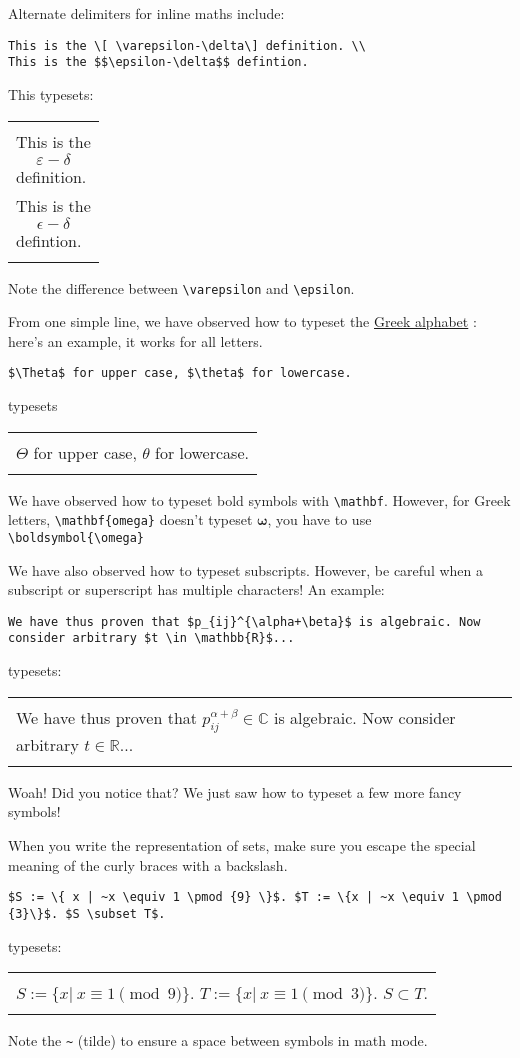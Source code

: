 \documentclass[12pt, letterpaper]{article}
\theoremstyle{remark}
\renewenvironment{boxed}
    {\begin{center}
    \begin{tabular}{|p{0.9\textwidth}|}
    \hline\\
    }
    { 
    \\\\\hline
    \end{tabular} 
    \end{center}
    }
\begin{document}
Alternate delimiters for inline maths include:
\begin{lstlisting}
This is the \[ \varepsilon-\delta\] definition. \\
This is the $$\epsilon-\delta$$ defintion.
\end{lstlisting}
This typesets:
\begin{boxed}
This is the \[\varepsilon-\delta\] definition. \\
This is the $$\epsilon-\delta$$ defintion.
\end{boxed}

Note the difference between \verb!\varepsilon! and \verb!\epsilon!. 

From one simple line, we have observed how to typeset the \href{https://web.mit.edu/jmorzins/www/greek-alphabet.html}{Greek alphabet} \cite{greek}: here's an example, it works for all letters.
\begin{lstlisting}
$\Theta$ for upper case, $\theta$ for lowercase.
\end{lstlisting}
typesets 
\begin{boxed}
$\Theta$ for upper case, $\theta$ for lowercase.
\end{boxed}

We have observed how to typeset bold symbols with \verb!\mathbf!. However, for Greek letters, \verb!\mathbf{omega}! doesn't typeset $\boldsymbol{\omega}$, you have to use \verb!\boldsymbol{\omega}!

We have also observed how to typeset subscripts. However, be careful when a subscript or superscript has multiple characters! An example:
\begin{lstlisting}
We have thus proven that $p_{ij}^{\alpha+\beta}$ is algebraic. Now consider arbitrary $t \in \mathbb{R}$...
\end{lstlisting}
typesets: 
\begin{boxed}
We have thus proven that $p_{ij}^{\alpha+\beta} \in \mathbb{C}$ is algebraic. Now consider arbitrary $t \in \mathbb{R}$...
\end{boxed}
Woah! Did you notice that? We just saw how to typeset a few more fancy symbols!

When you write the representation of sets, make sure you escape the special meaning of the curly braces with a backslash.

\begin{lstlisting}
$S := \{ x | ~x \equiv 1 \pmod {9} \}$. $T := \{x | ~x \equiv 1 \pmod {3}\}$. $S \subset T$.
\end{lstlisting}
typesets: 
\begin{boxed}
$S := \{ x | ~x \equiv 1 \pmod {9} \}$. $T := \{x | ~x \equiv 1 \pmod {3}\}$. $S \subset T$.
\end{boxed}
Note the \verb!~! (tilde) to ensure a space between symbols in math mode.
\end{document}
